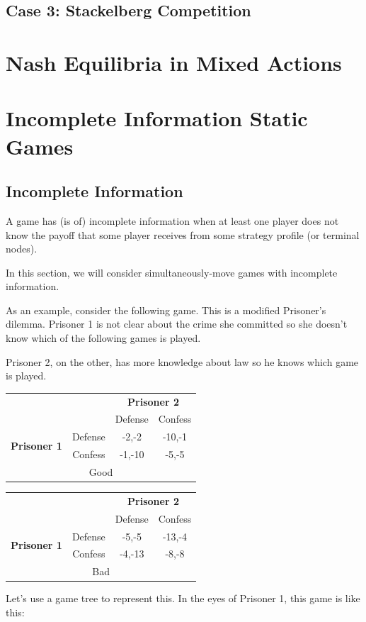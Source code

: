 \documentclass[12pt, oneside]{article}
\begin{document}
\subsection{Case 3: Stackelberg Competition}
\newpage
\section{Nash Equilibria in Mixed Actions}

\section{Incomplete Information Static Games}

\subsection{Incomplete Information}
A game has (is of) incomplete information when at least one player does not know the payoff that some player receives from some strategy profile (or terminal nodes).

In this section, we will consider simultaneously-move games with incomplete information.

As an example, consider the following game. This is a modified Prisoner’s dilemma. Prisoner 1 is not clear about the crime she committed so she doesn’t know which of the following games is played.

Prisoner 2, on the other, has more knowledge about law so he knows which game is played.

\begin{table}[h]
    \centering
    \renewcommand{\arraystretch}{1.2}
    \setlength{\tabcolsep}{8pt}
    \begin{tabular}{c c|c c|}
        \multicolumn{2}{c}{} & \multicolumn{2}{c}{\textbf{Prisoner 2}} \\
        \multicolumn{2}{c}{} & Defense & Confess \\
        \cline{2-4}
        \multirow{2}{*}{\textbf{Prisoner 1}} & Defense & -2,-2 & -10,-1 \\
        & Confess & -1,-10 & -5,-5 \\
        \cline{2-4}
        \multicolumn{4}{c}{Good}
    \end{tabular}
    \hspace{1cm}
    \begin{tabular}{c c|c c|}
        \multicolumn{2}{c}{} & \multicolumn{2}{c}{\textbf{Prisoner 2}} \\
        \multicolumn{2}{c}{} & Defense & Confess \\
        \cline{2-4}
        \multirow{2}{*}{\textbf{Prisoner 1}} & Defense & -5,-5 & -13,-4 \\
        & Confess & -4,-13 & -8,-8 \\
        \cline{2-4}
        \multicolumn{4}{c}{Bad}
    \end{tabular}
\end{table}
\break
Let's use a game tree to represent this. In the eyes of Prisoner 1, this game is like this:
\end{document}
